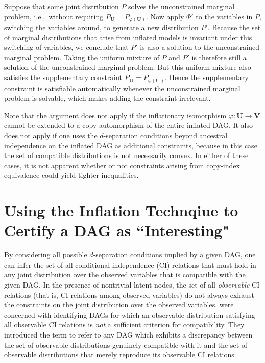 Suppose that some joint distribution $P$ solves the unconstrained marginal problem, i.e.,~without requiring $P_{\bm{U}} = P_{\varphi(\bm{U})}$. Now apply $\Phi'$ to the variables in $P$, switching the variables around, to generate a new distribution $P'$. Because the set of marginal distributions that arise from inflated models is invariant under this switching of variables, we conclude that $P'$ is also a solution to the unconstrained marginal problem. Taking the uniform mixture of $P$ and $P'$ is therefore still a solution of the unconstrained marginal problem. But this uniform mixture also satisfies the supplementary constraint $P_{\bm{U}} = P_{\varphi(\bm{U})}$. Hence the supplementary constraint is satisfiable automatically whenever the unconstrained marginal problem is solvable, which makes adding the constraint irrelevant.

Note that the argument does not apply if the inflationary isomorphism $\varphi:\bm{U}\to\bm{V}$ cannot be extended to a copy automorphism of the entire inflated DAG. It also does not apply if one uses the $d$-separation conditions beyond ancestral independence  on the inflated DAG as additional constraints, because in this case the set of compatible distributions is not necessarily convex.  In either of these cases, it is not apparent whether or not constraints arising from copy-index equivalence could yield tighter inequalities. 




\section{Using the Inflation Technqiue to Certify a DAG as ``Interesting"\label{sec:interestingproof}}

By considering all possible $d$-separation conditions implied by a given DAG, one can infer the set of all conditional independence (CI) relations that must hold in any joint distribution over the observed variables that is compatible with the given DAG. In the presence of nontrivial latent nodes, the set of all  \emph{observable} CI relations (that is, CI relations among observed variables) 
do not always exhaust the constraints on the joint distribution over the observed variables. \citet{pusey2014gdag} were concerned with identifying DAGs for which an observable distribution satisfying all observable CI relations is \emph{not} a sufficient criterion for compatibility.  They introduced the term  to refer to any DAG which exhibits a discrepancy between the set of observable distributions genuinely compatible with it and the set of observable distributions that merely reproduce its observable CI relations.

